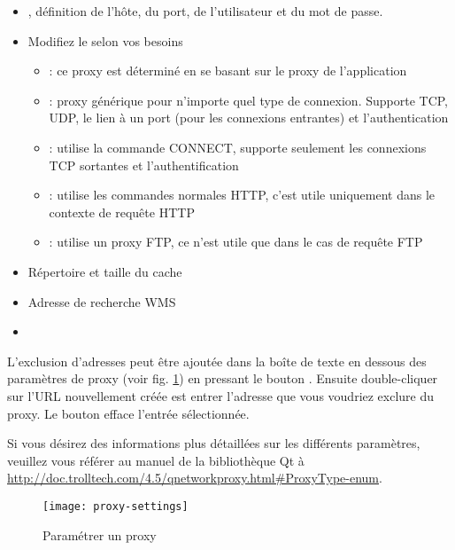 {\setlength{\baselineskip}{1.4\baselineskip}
\begin{itemize}[label=--]
\item {}, définition de l'hôte, du port, de l'utilisateur et du mot de passe.
\item Modifiez le  selon vos besoins
 \begin{itemize}[label=--,itemsep=2pt]
  \item {}: ce proxy est déterminé en se basant sur le proxy de l'application
  \item {}: proxy générique pour n'importe quel type de connexion. Supporte TCP, UDP, le lien à un port (pour les connexions entrantes) et l'authentication
  \item {}: utilise la commande CONNECT, supporte seulement les connexions TCP sortantes et l'authentification
  \item {}: utilise les commandes normales HTTP, c'est utile uniquement dans le contexte de requête HTTP
  \item {}: utilise un proxy FTP, ce n'est utile que dans le cas de requête FTP
\end{itemize}
\item Répertoire et taille du cache
\item Adresse de recherche WMS
\item {}
\end{itemize}}

L'exclusion d'adresses peut être ajoutée dans la boîte de texte en dessous des paramètres de proxy (voir fig. \ref{fig:proxy-settings}) en pressant le bouton . Ensuite double-cliquer sur l'URL nouvellement créée est entrer l'adresse que vous voudriez exclure du proxy. Le bouton  efface l'entrée sélectionnée.

Si vous désirez des informations plus détaillées sur les différents paramètres, veuillez vous référer au manuel de la bibliothèque Qt à \url{http://doc.trolltech.com/4.5/qnetworkproxy.html#ProxyType-enum}.

\begin{figure}[ht]
   \begin{center}
   \texttt{[image: proxy-settings]}
   \caption{Paramétrer un proxy \nixcaption}
   \label{fig:proxy-settings}
\end{center} 
\end{figure}

